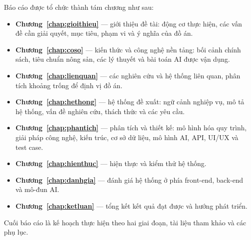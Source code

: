 Báo cáo được tổ chức thành tám chương như sau:
\begin{itemize}
    \item \textbf{Chương~\ref{chap:gioithieu}} --- giới thiệu đề tài: động cơ thực hiện, các vấn đề cần giải quyết, mục tiêu, phạm vi và ý nghĩa của đồ án.
    \item \textbf{Chương~\ref{chap:coso}} --- kiến thức và công nghệ nền tảng: bối cảnh chính sách, tiêu chuẩn nông sản, các lý thuyết và bài toán AI được vận dụng.
    \item \textbf{Chương~\ref{chap:lienquan}} --- các nghiên cứu và hệ thống liên quan, phân tích khoảng trống để định vị đồ án.
    \item \textbf{Chương~\ref{chap:hethong}} --- hệ thống đề xuất: ngữ cảnh nghiệp vụ, mô tả hệ thống, vấn đề nghiên cứu, thách thức và các yêu cầu.
    \item \textbf{Chương~\ref{chap:phantich}} --- phân tích và thiết kế: mô hình hóa quy trình, giải pháp công nghệ, kiến trúc, cơ sở dữ liệu, mô hình AI, API, UI/UX và test case.
    \item \textbf{Chương~\ref{chap:hienthuc}} --- hiện thực và kiểm thử hệ thống.
    \item \textbf{Chương~\ref{chap:danhgia}} --- đánh giá hệ thống ở phía front-end, back-end và mô-đun AI.
    \item \textbf{Chương~\ref{chap:ketluan}} --- tổng kết kết quả đạt được và hướng phát triển.
\end{itemize}
Cuối báo cáo là kế hoạch thực hiện theo hai giai đoạn, tài liệu tham khảo và các phụ lục.
